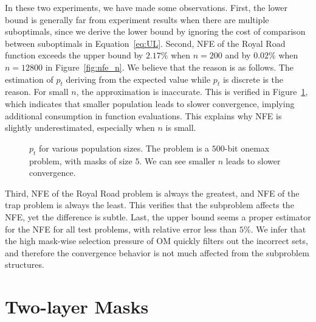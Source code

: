 \documentclass{sig-alternate}
\begin{document}
In these two experiments, we have made some observations.
First, the lower bound is generally far from experiment results when there are multiple suboptimals,
since we derive the lower bound by ignoring the cost of comparison between suboptimals
in Equation~\ref{eq:UL}.
Second,
NFE of the Royal Road function exceeds the upper bound by $2.17\%$ when $n=200$ and by $0.02\%$ when $n=12800$
in Figure~\ref{fig:nfe_n}.
We believe that the reason is as follows.
The estimation of $p_t$ deriving from the expected value %
while $p_t$ is discrete is the reason.
For small $n$, the approximation is inaccurate.
This is verified in Figure~\ref{fig:pt_n}, which indicates that
smaller population leads to slower convergence, %
implying additional consumption in function evaluations.
This explains why NFE is slightly underestimated, especially when $n$ is small.
\begin{figure}%
\centering
{}
\caption{$p_t$ for various population sizes.
The problem is a $500$-bit onemax problem, with masks of size $5$.
We can see smaller $n$ leads to slower convergence.}
\label{fig:pt_n}
\end{figure}
Third, NFE of the Royal Road problem is always the greatest,
and NFE of the trap problem is always the least.
This verifies that the subproblem affects the NFE, yet the difference is subtle.
Last, the upper bound seems a proper estimator for the NFE for all test problems, %
with relative error less than $5\%$.
We infer that the high mask-wise selection pressure of OM
quickly filters out the incorrect sets,
and therefore the convergence behavior is not much affected from the subproblem structures.

\section{Two-layer Masks}
\label{sec:twoLayerNonOverlappingMasks}
\end{document}
